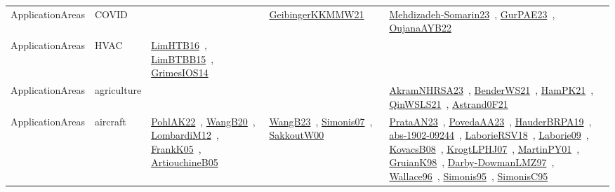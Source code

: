 {\begin{longtable}{lp{3cm}>{\raggedright\arraybackslash}p{6cm}>{\raggedright\arraybackslash}p{6cm}>{\raggedright\arraybackslash}p{8cm}}
ApplicationAreas & COVID &  & \href{papers/GeibingerKKMMW21.pdf}{GeibingerKKMMW21}~\cite{GeibingerKKMMW21} & \href{papers/Mehdizadeh-Somarin23.pdf}{Mehdizadeh-Somarin23}~\cite{Mehdizadeh-Somarin23}, \href{articles/GurPAE23.pdf}{GurPAE23}~\cite{GurPAE23}, \href{papers/OujanaAYB22.pdf}{OujanaAYB22}~\cite{OujanaAYB22}\\
ApplicationAreas & HVAC & \href{papers/LimHTB16.pdf}{LimHTB16}~\cite{LimHTB16}, \href{papers/LimBTBB15.pdf}{LimBTBB15}~\cite{LimBTBB15}, \href{articles/GrimesIOS14.pdf}{GrimesIOS14}~\cite{GrimesIOS14} &  & \\
ApplicationAreas & agriculture &  &  & \href{articles/AkramNHRSA23.pdf}{AkramNHRSA23}~\cite{AkramNHRSA23}, \href{papers/BenderWS21.pdf}{BenderWS21}~\cite{BenderWS21}, \href{articles/HamPK21.pdf}{HamPK21}~\cite{HamPK21}, \href{articles/QinWSLS21.pdf}{QinWSLS21}~\cite{QinWSLS21}, \href{papers/Astrand0F21.pdf}{Astrand0F21}~\cite{Astrand0F21}\\
ApplicationAreas & aircraft & \href{articles/PohlAK22.pdf}{PohlAK22}~\cite{PohlAK22}, \href{papers/WangB20.pdf}{WangB20}~\cite{WangB20}, \href{articles/LombardiM12.pdf}{LombardiM12}~\cite{LombardiM12}, \href{papers/FrankK05.pdf}{FrankK05}~\cite{FrankK05}, \href{papers/ArtiouchineB05.pdf}{ArtiouchineB05}~\cite{ArtiouchineB05} & \href{papers/WangB23.pdf}{WangB23}~\cite{WangB23}, \href{articles/Simonis07.pdf}{Simonis07}~\cite{Simonis07}, \href{articles/SakkoutW00.pdf}{SakkoutW00}~\cite{SakkoutW00} & \href{articles/PrataAN23.pdf}{PrataAN23}~\cite{PrataAN23}, \href{papers/PovedaAA23.pdf}{PovedaAA23}~\cite{PovedaAA23}, \href{articles/HauderBRPA19.pdf}{HauderBRPA19}~\cite{HauderBRPA19}, \href{articles/abs-1902-09244.pdf}{abs-1902-09244}~\cite{abs-1902-09244}, \href{articles/LaborieRSV18.pdf}{LaborieRSV18}~\cite{LaborieRSV18}, \href{papers/Laborie09.pdf}{Laborie09}~\cite{Laborie09}, \href{articles/KovacsB08.pdf}{KovacsB08}~\cite{KovacsB08}, \href{papers/KrogtLPHJ07.pdf}{KrogtLPHJ07}~\cite{KrogtLPHJ07}, \href{articles/MartinPY01.pdf}{MartinPY01}~\cite{MartinPY01}, \href{papers/GruianK98.pdf}{GruianK98}~\cite{GruianK98}, \href{articles/Darby-DowmanLMZ97.pdf}{Darby-DowmanLMZ97}~\cite{Darby-DowmanLMZ97}, \href{articles/Wallace96.pdf}{Wallace96}~\cite{Wallace96}, \href{papers/Simonis95.pdf}{Simonis95}~\cite{Simonis95}, \href{papers/SimonisC95.pdf}{SimonisC95}~\cite{SimonisC95}\\

\end{longtable}}
